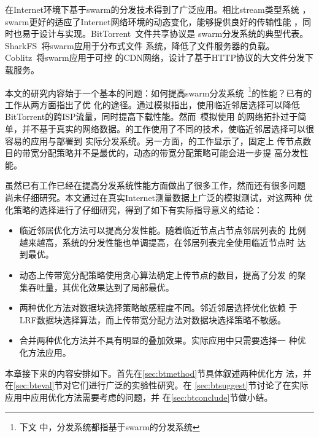 在Internet环境下基于swarm的分发技术得到了广泛应用。相比stream类型系统
，swarm更好的适应了Internet网络环境的动态变化，能够提供良好的传输性能
，同时也易于设计与实现。BitTorrent~\cite{bittorrent}文件共享协议是
swarm分发系统的典型代表。SharkFS~\cite{sharkfs}将swarm应用于分布式文件
系统，降低了文件服务器的负载。Coblitz~\cite{coblitz}将swarm应用于可控
的CDN网络，设计了基于HTTP协议的大文件分发下载服务。

本文的研究内容始于一个基本的问题：如何提高swarm分发系统~\footnote{下文
中，分发系统都指基于swarm的分发系统}的性能？已有的工作从两方面指出了优
化的途径。通过模拟指出，使用临近邻居选择可以降低
BitTorrent的跨ISP流量，同时提高下载性能。然而~模拟使用
的网络拓扑过于简单，并不基于真实的网络数据。的工作使用了不同的技术，使临近邻居选择可以很容易的应用与部署到
实际分发系统。另一方面，的工作显示了，固定上
传节点数目的带宽分配策略并不是最优的，动态的带宽分配策略可能会进一步提
高分发性能。


虽然已有工作已经在提高分发系统性能方面做出了很多工作，然而还有很多问题
尚未仔细研究。本文通过在真实Internet测量数据上广泛的模拟测试，对这两种
优化策略的选择进行了仔细研究，得到了如下有实际指导意义的结论：


\begin{itemize}

  \item 临近邻居优化方法可以提高分发性能。随着临近节点占节点邻居列表的
  比例越来越高，系统的分发性能也单调提高，在邻居列表完全使用临近节点时
  达到最优。

  \item 动态上传带宽分配策略使用贪心算法确定上传节点的数目，提高了分发
  的聚集吞吐量，其优化效果达到了局部最优。
  
  \item 两种优化方法对数据块选择策略敏感程度不同。邻近邻居选择优化依赖
  于LRF数据块选择算法，而上传带宽分配方法对数据块选择策略不敏感。

  \item 合并两种优化方法并不具有明显的叠加效果。实际应用中只需要选择一
  种优化方法应用。

\end{itemize}

本章接下来的内容安排如下。首先在\ref{sec:btmethod}节具体叙述两种优化方
法，并在\ref{sec:bteval}节对它们进行广泛的实验性研究。在
\ref{sec:btsuggest}节讨论了在实际应用中应用优化方法需要考虑的问题，并
在\ref{sec:btconclude}节做小结。

